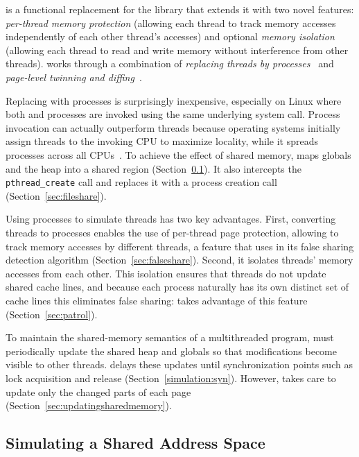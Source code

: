 \label{sec:simulation}


\sheriff{} is a functional replacement for the \pthreads{} library
that extends it with two novel features: \emph{per-thread memory protection} (allowing each thread to track memory accesses
independently of each other thread's accesses) and optional
\emph{memory isolation} (allowing each thread to read and write memory
without interference from other threads). \sheriff{} works through a
combination of \emph{replacing threads by processes}~\cite{grace} and
\emph{page-level twinning and diffing}~\cite{dsm:munin,dsm:treadmarks}.

Replacing \pthreads{} with
processes is surprisingly inexpensive, especially on Linux where both
\pthreads{} and processes are invoked using the same underlying system
call. Process invocation can actually
outperform threads because operating systems initially assign threads to the invoking
CPU to maximize locality, while it spreads processes across all CPUs~\cite{grace}. To
achieve the effect of shared memory, \sheriff{} maps globals and the
heap into a shared region (Section~\ref{simulation:sharememory}). It
also intercepts the \texttt{pthread\_create} call and replaces it with
a process creation call (Section~\ref{sec:fileshare}).

Using processes to simulate threads has two key advantages. First,
converting threads to processes enables the use of
per-thread page protection, allowing \sheriff{} to track memory
accesses by different threads, a feature that \sheriffdetect{} uses in
its false sharing detection algorithm (Section~\ref{sec:falseshare}).
Second, it
isolates threads' memory accesses from each other. This isolation
ensures that threads do not update shared cache lines, and because each
process naturally has its own distinct set of cache lines this
eliminates false sharing: \sheriffprotect{} takes advantage of this
feature (Section~\ref{sec:patrol}). 

To maintain the shared-memory semantics of a multithreaded program,
\sheriff{} must periodically update the shared heap and globals so
that modifications become visible to other threads. \sheriff{} delays these updates
until synchronization points such as lock acquisition and release
(Section~\ref{simulation:syn}). However, \sheriff{} takes care to
update only the changed parts of each page (Section~\ref{sec:updatingsharedmemory}).

\subsection{Simulating a Shared Address Space}
\label{simulation:sharememory}

